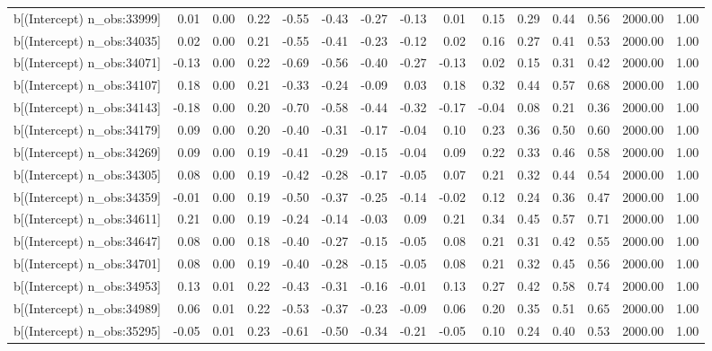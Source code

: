\begin{table}[ht]
\begin{tabular}{rrrrrrrrrrrrrrr}
  b[(Intercept) n\_obs:33999] & 0.01 & 0.00 & 0.22 & -0.55 & -0.43 & -0.27 & -0.13 & 0.01 & 0.15 & 0.29 & 0.44 & 0.56 & 2000.00 & 1.00 \\ 
  b[(Intercept) n\_obs:34035] & 0.02 & 0.00 & 0.21 & -0.55 & -0.41 & -0.23 & -0.12 & 0.02 & 0.16 & 0.27 & 0.41 & 0.53 & 2000.00 & 1.00 \\ 
  b[(Intercept) n\_obs:34071] & -0.13 & 0.00 & 0.22 & -0.69 & -0.56 & -0.40 & -0.27 & -0.13 & 0.02 & 0.15 & 0.31 & 0.42 & 2000.00 & 1.00 \\ 
  b[(Intercept) n\_obs:34107] & 0.18 & 0.00 & 0.21 & -0.33 & -0.24 & -0.09 & 0.03 & 0.18 & 0.32 & 0.44 & 0.57 & 0.68 & 2000.00 & 1.00 \\ 
  b[(Intercept) n\_obs:34143] & -0.18 & 0.00 & 0.20 & -0.70 & -0.58 & -0.44 & -0.32 & -0.17 & -0.04 & 0.08 & 0.21 & 0.36 & 2000.00 & 1.00 \\ 
  b[(Intercept) n\_obs:34179] & 0.09 & 0.00 & 0.20 & -0.40 & -0.31 & -0.17 & -0.04 & 0.10 & 0.23 & 0.36 & 0.50 & 0.60 & 2000.00 & 1.00 \\ 
  b[(Intercept) n\_obs:34269] & 0.09 & 0.00 & 0.19 & -0.41 & -0.29 & -0.15 & -0.04 & 0.09 & 0.22 & 0.33 & 0.46 & 0.58 & 2000.00 & 1.00 \\ 
  b[(Intercept) n\_obs:34305] & 0.08 & 0.00 & 0.19 & -0.42 & -0.28 & -0.17 & -0.05 & 0.07 & 0.21 & 0.32 & 0.44 & 0.54 & 2000.00 & 1.00 \\ 
  b[(Intercept) n\_obs:34359] & -0.01 & 0.00 & 0.19 & -0.50 & -0.37 & -0.25 & -0.14 & -0.02 & 0.12 & 0.24 & 0.36 & 0.47 & 2000.00 & 1.00 \\ 
  b[(Intercept) n\_obs:34611] & 0.21 & 0.00 & 0.19 & -0.24 & -0.14 & -0.03 & 0.09 & 0.21 & 0.34 & 0.45 & 0.57 & 0.71 & 2000.00 & 1.00 \\ 
  b[(Intercept) n\_obs:34647] & 0.08 & 0.00 & 0.18 & -0.40 & -0.27 & -0.15 & -0.05 & 0.08 & 0.21 & 0.31 & 0.42 & 0.55 & 2000.00 & 1.00 \\ 
  b[(Intercept) n\_obs:34701] & 0.08 & 0.00 & 0.19 & -0.40 & -0.28 & -0.15 & -0.05 & 0.08 & 0.21 & 0.32 & 0.45 & 0.56 & 2000.00 & 1.00 \\ 
  b[(Intercept) n\_obs:34953] & 0.13 & 0.01 & 0.22 & -0.43 & -0.31 & -0.16 & -0.01 & 0.13 & 0.27 & 0.42 & 0.58 & 0.74 & 2000.00 & 1.00 \\ 
  b[(Intercept) n\_obs:34989] & 0.06 & 0.01 & 0.22 & -0.53 & -0.37 & -0.23 & -0.09 & 0.06 & 0.20 & 0.35 & 0.51 & 0.65 & 2000.00 & 1.00 \\ 
  b[(Intercept) n\_obs:35295] & -0.05 & 0.01 & 0.23 & -0.61 & -0.50 & -0.34 & -0.21 & -0.05 & 0.10 & 0.24 & 0.40 & 0.53 & 2000.00 & 1.00 \\ 

\end{tabular}
\end{table}
